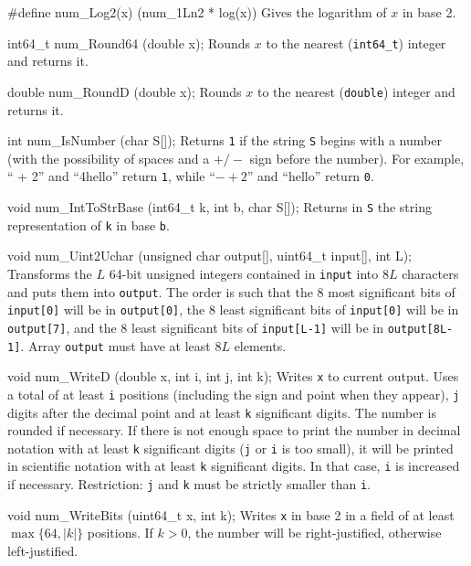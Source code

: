 #define num_Log2(x) (num_1Ln2 * log(x))
\endcode
  \tab Gives the logarithm of $x$ in base 2.
  \endtab
\code

int64_t num_Round64 (double x);
\endcode
  \tab Rounds $x$ to the nearest ({\tt int64\_t}) integer and returns it.
  \endtab
\code

double num_RoundD (double x);
\endcode
  \tab Rounds $x$ to the nearest ({\tt double}) integer and returns it.
  \endtab
\code

int num_IsNumber (char S[]);
\endcode
\tab  Returns {\tt 1} if the string {\tt S} begins with a number
   (with the possibility of spaces and a $+/-$ sign
   before the number). For example, `` + 2'' and ``4hello''
   return {\tt 1}, while ``$-+2$'' and ``hello'' return  {\tt 0}.
\endtab
\code

void num_IntToStrBase (int64_t k, int b, char S[]);
\endcode
  \tab Returns in {\tt S} the string representation of {\tt k} in base {\tt b}.
  \endtab
\code

void num_Uint2Uchar (unsigned char output[], uint64_t input[], int L);
\endcode
  \tab Transforms the $L$ 64-bit unsigned integers contained in {\tt input} into
  $8L$ characters and puts them into {\tt output}. The order is such that
  the 8 most significant bits of {\tt input[0]} will be in {\tt output[0]},
  the 8 least significant bits of {\tt input[0]} will be in {\tt output[7]},
  and the 8 least significant bits of {\tt input[L-1]} will be in
  {\tt output[8L-1]}. Array {\tt output} must have at least $8L$ elements.
  \endtab
\code

void num_WriteD (double x, int i, int j, int k);
\endcode
  \tab  Writes {\tt x} to current output.  Uses a total of at least {\tt i}
   positions (including the sign and point when they appear),
   {\tt j} digits after the decimal point and at least {\tt k}
   significant digits.   The number is rounded if necessary.
   If there is not enough space to print the number in decimal notation
   with at least {\tt k} significant digits
   ({\tt j} or {\tt i} is too small), it will be printed in scientific
   notation with at least {\tt k} significant digits.
   In that case, {\tt i} is increased if necessary.
   Restriction: {\tt j} and {\tt k} must be strictly smaller than {\tt i}.
 \endtab
\code

void num_WriteBits (uint64_t x, int k);
\endcode
 \tab Writes {\tt x} in base 2 in a field of at least $\max\{64, |k|\}$ positions.
  If $k>0$, the number will be right-justified, otherwise left-justified.
 \endtab
\code

